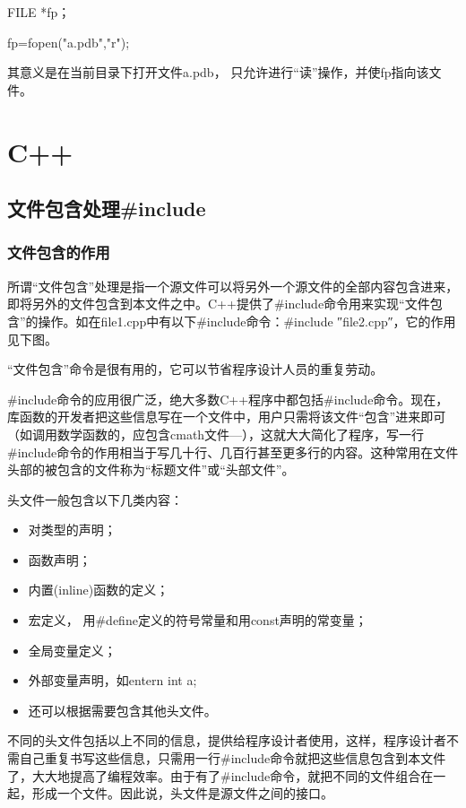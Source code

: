 FILE *fp；

fp=fopen("a.pdb","r");

其意义是在当前目录下打开文件a.pdb， 只允许进行“读”操作，并使fp指向该文件。





\chapter{C++}
\section{文件包含处理\#include}
\subsection{文件包含的作用}
所谓“文件包含”处理是指一个源文件可以将另外一个源文件的全部内容包含进来，即将另外的文件包含到本文件之中。C++提供了\#include命令用来实现“文件包含”的操作。如在file1.cpp中有以下\#include命令：\#include ″file2.cpp″，它的作用见下图。


“文件包含”命令是很有用的，它可以节省程序设计人员的重复劳动。

\#include命令的应用很广泛，绝大多数C++程序中都包括\#include命令。现在，库函数的开发者把这些信息写在一个文件中，用户只需将该文件“包含”进来即可（如调用数学函数的，应包含cmath文件—），这就大大简化了程序，写一行\#include命令的作用相当于写几十行、几百行甚至更多行的内容。这种常用在文件头部的被包含的文件称为“标题文件”或“头部文件”。

头文件一般包含以下几类内容：
\begin{itemize}
\item 对类型的声明；
\item 函数声明；
\item 内置(inline)函数的定义；
\item 宏定义， 用\#define定义的符号常量和用const声明的常变量；
\item 全局变量定义；
\item 外部变量声明，如entern int a;
\item 还可以根据需要包含其他头文件。
\end{itemize}

不同的头文件包括以上不同的信息，提供给程序设计者使用，这样，程序设计者不需自己重复书写这些信息，只需用一行\#include命令就把这些信息包含到本文件了，大大地提高了编程效率。由于有了\#include命令，就把不同的文件组合在一起，形成一个文件。因此说，头文件是源文件之间的接口。


